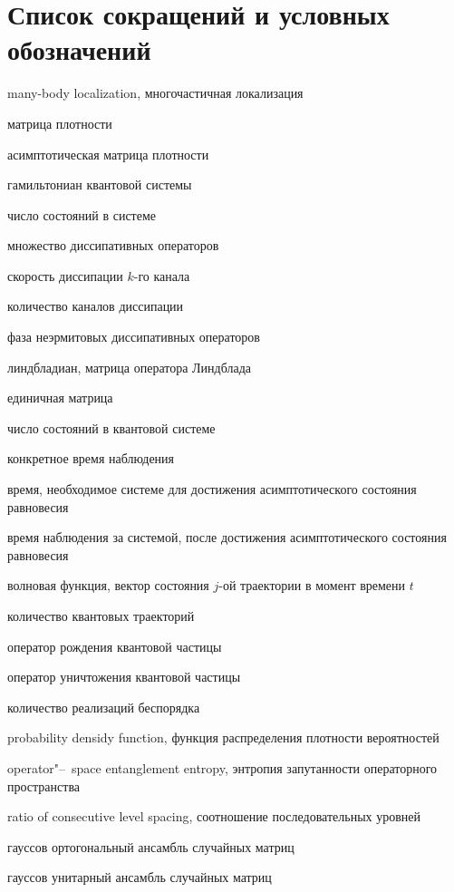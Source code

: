 \chapter*{Список сокращений и условных обозначений} %
\begin{description}[align=right,leftmargin=3.5cm]
\item[MBL] many-body localization, многочастичная локализация
\item[\(\rho\)] матрица плотности
\item[\(\rho^A\)] асимптотическая матрица плотности
\item[\(H\)] гамильтониан квантовой системы
\item[\(S\)] число состояний в системе
\item[\(\{V_k\}\)] множество диссипативных операторов
\item[\(\gamma_k\)] скорость диссипации \(k\)-го канала
\item[\(K\)] количество каналов диссипации
\item[\(\alpha\)] фаза неэрмитовых диссипативных операторов
\item[\(L\)] линдбладиан, матрица оператора Линдблада
\item[\(\idmtx\)] единичная матрица
\item[\(N\)] число состояний в квантовой системе
\item[\(t^C\)] конкретное время наблюдения
\item[\(t^A\)] время, необходимое системе для достижения асимптотического состояния равновесия
\item[\(t^O\)] время наблюдения за системой, после достижения асимптотического состояния равновесия
\item[\(| \psi_j (t) \rangle\)] волновая функция, вектор состояния \(j\)-ой траектории в момент времени \(t\)
\item[\(M_r\)] количество квантовых траекторий
\item[\(b\)] оператор рождения квантовой частицы
\item[\(b^\dagger\)] оператор уничтожения квантовой частицы
\item[\(N_r\)] количество реализаций беспорядка
\item[PDF] probability densidy function, функция распределения плотности вероятностей
\item[OSEE, \(S^\natural\)] operator"--~space entanglement entropy, энтропия запутанности операторного пространства
\item[RCLS,  \(r\)] ratio of consecutive level spacing, соотношение последовательных уровней
\item[GOE] гауссов ортогональный ансамбль случайных матриц
\item[GUE] гауссов унитарный ансамбль случайных матриц
\end{description}
